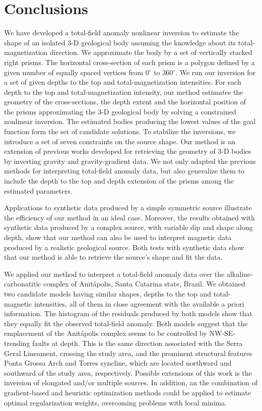 \section{Conclusions}

We have developed a total-field anomaly nonlinear inversion to estimate the shape 
of an isolated 3-D geological body assuming the knowledge about its 
total-magnetization direction. We approximate the body by a set of vertically 
stacked right prisms. The horizontal cross-section of each prism is a polygon 
defined by a given number of equally spaced vertices from 0$^\circ$ to 360$^\circ$. 
We run our inversion for a set of given depths to the top and total-magnetization 
intensities. For each depth to the top and total-magnetization intensity,
our method estimates the geometry of the cross-sections, the depth extent and 
the horizontal position of the prisms approximating the 3-D geological body by 
solving a constrained nonlinear inversion.
The estimated bodies producing the lowest values of the goal function form the 
set of candidate solutions. 
To stabilize the inversions, we introduce a set of seven constraints on the source 
shape.
Our method is an extension of previous works developed for retrieving the geometry 
of 3-D bodies by inverting gravity and gravity-gradient data. 
We not only adapted the previous methods for interpreting total-field anomaly data,
but also generalize them to include the depth to the top and depth extension of 
the prisms among the estimated parameters.

Applications to synthetic data produced by a simple symmetric source 
illustrate the efficiency of our method in an ideal case. Moreover, the results 
obtained with synthetic data produced by a complex source, with variable dip and 
shape along depth, show that our method can also be used to interpret magnetic 
data produced by a realistic geological source. 
Both tests with synthetic data show that our method is able to retrieve the 
source's shape and fit the data.

We applied our method to interpret a total-field anomaly data over the 
alkaline-carbonatitic complex of Anit{\'a}polis, Santa Catarina state, Brazil. 
We obtained two candidate models having similar shapes, depths to the top and 
total-magnetic intensities, all of them in close agreement with the available 
a priori information. 
The histogram of the residuals produced by both models show that they equally 
fit the observed total-field anomaly.
Both models suggest that the emplacement of the 
Anit{\'a}polis complex seems to be controlled by NW-SE-trending faults at depth.
This is the same direction associated with the Serra Geral Lineament, 
crossing the study area, and the prominent structural features 
Ponta Grossa Arch and Torres syncline, which are located 
northward and southward of the study area, respectively.
Possible extensions of this work is the inversion of elongated and/or multiple 
sources. In addition, an the combination of gradient-based and heuristic optimization 
methods could be applied to estimate optimal regularization weights, 
overcoming problems with local minima.